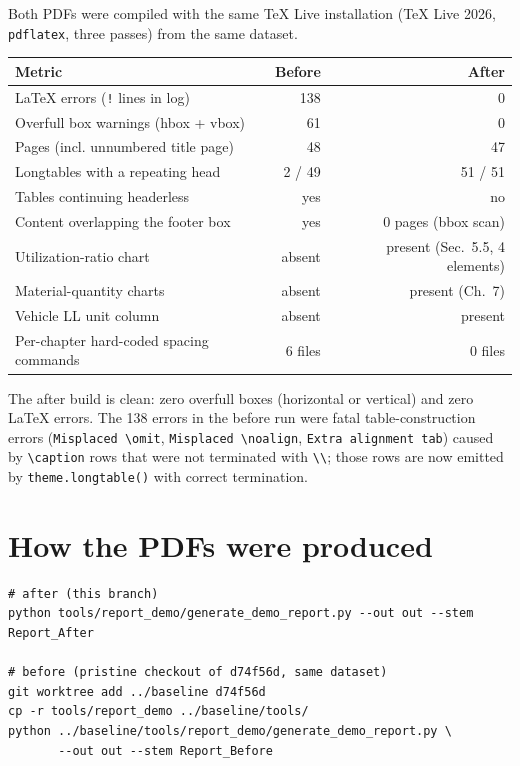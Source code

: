 \documentclass[11pt,a4paper]{article}
\newcommand{\code}[1]{\texttt{\small #1}}
\begin{document}
Both PDFs were compiled with the same TeX Live installation (TeX Live 2026,
\code{pdflatex}, three passes) from the same dataset.

\begin{center}
\begin{tabular}{@{}lrr@{}}
\toprule
\textbf{Metric} & \textbf{Before} & \textbf{After} \\
\midrule
LaTeX errors (\code{!} lines in log)          & 138 & 0 \\
Overfull box warnings (hbox + vbox)            & 61  & 0 \\
Pages (incl. unnumbered title page)            & 48  & 47 \\
Longtables with a repeating head               & 2 / 49 & 51 / 51 \\
Tables continuing headerless                   & yes & no \\
Content overlapping the footer box             & yes & 0 pages (bbox scan) \\
Utilization-ratio chart                        & absent & present (Sec.~5.5, 4 elements) \\
Material-quantity charts                       & absent & present (Ch.~7) \\
Vehicle LL unit column                         & absent & present \\
Per-chapter hard-coded spacing commands        & 6 files & 0 files \\
\bottomrule
\end{tabular}
\end{center}

The after build is clean: zero overfull boxes (horizontal or vertical) and zero
LaTeX errors. The 138 errors in the before run were fatal
table-construction errors (\code{Misplaced \textbackslash omit},
\code{Misplaced \textbackslash noalign}, \code{Extra alignment tab}) caused by
\code{\textbackslash caption} rows that were not terminated with
\code{\textbackslash\textbackslash}; those rows are now emitted by
\code{theme.longtable()} with correct termination.

\section{How the PDFs were produced}

\begin{verbatim}
# after (this branch)
python tools/report_demo/generate_demo_report.py --out out --stem Report_After

# before (pristine checkout of d74f56d, same dataset)
git worktree add ../baseline d74f56d
cp -r tools/report_demo ../baseline/tools/
python ../baseline/tools/report_demo/generate_demo_report.py \
       --out out --stem Report_Before
\end{verbatim}
\end{document}
